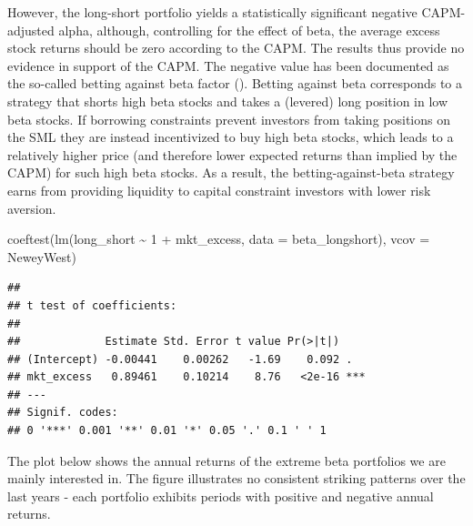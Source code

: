 \documentclass[
]{book}
\newenvironment{Shaded}{\begin{snugshade}}{\end{snugshade}}
\newcommand{\AttributeTok}[1]{\textcolor[rgb]{0.61,0.61,0.61}{#1}}
\newcommand{\DecValTok}[1]{\textcolor[rgb]{0.06,0.06,0.06}{#1}}
\newcommand{\FunctionTok}[1]{\textcolor[rgb]{0,0,0}{#1}}
\newcommand{\NormalTok}[1]{#1}
\newcommand{\SpecialCharTok}[1]{\textcolor[rgb]{0,0,0}{#1}}
\begin{document}
However, the long-short portfolio yields a statistically significant negative CAPM-adjusted alpha, although, controlling for the effect of beta, the average excess stock returns should be zero according to the CAPM. The results thus provide no evidence in support of the CAPM. The negative value has been documented as the so-called betting against beta factor (\citet{Frazzini2014}). Betting against beta corresponds to a strategy that shorts high beta stocks and takes a (levered) long position in low beta stocks. If borrowing constraints prevent investors from taking positions on the SML they are instead incentivized to buy high beta stocks, which leads to a relatively higher price (and therefore lower expected returns than implied by the CAPM) for such high beta stocks. As a result, the betting-against-beta strategy earns from providing liquidity to capital constraint investors with lower risk aversion.

\begin{Shaded}
\begin{Highlighting}[]
\FunctionTok{coeftest}\NormalTok{(}\FunctionTok{lm}\NormalTok{(long\_short }\SpecialCharTok{\textasciitilde{}} \DecValTok{1} \SpecialCharTok{+}\NormalTok{ mkt\_excess, }\AttributeTok{data =}\NormalTok{ beta\_longshort), }
         \AttributeTok{vcov =}\NormalTok{ NeweyWest)}
\end{Highlighting}
\end{Shaded}

\begin{verbatim}
## 
## t test of coefficients:
## 
##             Estimate Std. Error t value Pr(>|t|)    
## (Intercept) -0.00441    0.00262   -1.69    0.092 .  
## mkt_excess   0.89461    0.10214    8.76   <2e-16 ***
## ---
## Signif. codes:  
## 0 '***' 0.001 '**' 0.01 '*' 0.05 '.' 0.1 ' ' 1
\end{verbatim}

The plot below shows the annual returns of the extreme beta portfolios we are mainly interested in. The figure illustrates no consistent striking patterns over the last years - each portfolio exhibits periods with positive and negative annual returns.
\end{document}
